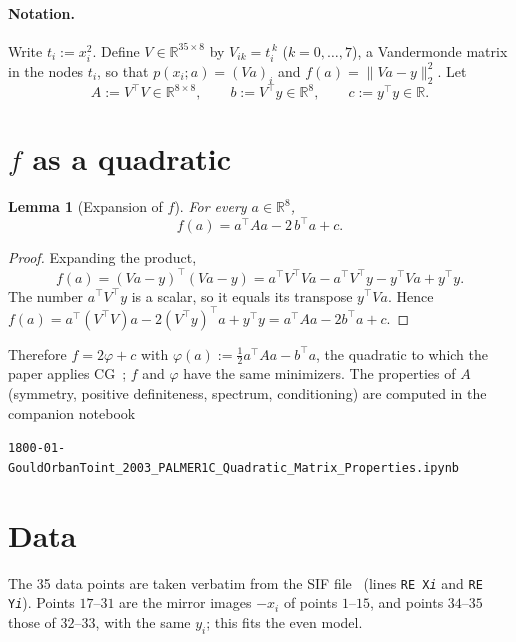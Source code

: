 \documentclass[11pt]{article}
\newtheorem{lemma}{Lemma}
\newcommand{\R}{\mathbb{R}}
\begin{document}
\paragraph{Notation.} Write $t_i:=x_i^2$. Define $V\in\R^{35\times 8}$ by
$V_{ik}=t_i^{\,k}$ ($k=0,\dots,7$), a Vandermonde matrix in the nodes $t_i$, so
that $p(x_i;a)=(Va)_i$ and $f(a)=\|Va-y\|_2^2$. Let
\[
  A:=V^{\top}V\in\R^{8\times8},\qquad b:=V^{\top}y\in\R^8,\qquad c:=y^{\top}y\in\R .
\]
\section{\texorpdfstring{$f$}{f} as a quadratic}

\begin{lemma}[Expansion of $f$]\label{lem:exp}
For every $a\in\R^8$,
\[
  f(a)=a^{\top}Aa-2\,b^{\top}a+c .
\]
\end{lemma}

\begin{proof}
Expanding the product,
\[
  f(a)=(Va-y)^{\top}(Va-y)=a^{\top}V^{\top}Va-a^{\top}V^{\top}y-y^{\top}Va+y^{\top}y .
\]
The number $a^{\top}V^{\top}y$ is a scalar, so it equals its transpose
$y^{\top}Va$. Hence $f(a)=a^{\top}(V^{\top}V)a-2(V^{\top}y)^{\top}a+y^{\top}y
=a^{\top}Aa-2b^{\top}a+c$.
\end{proof}

Therefore $f=2\varphi+c$ with $\varphi(a):=\tfrac12a^{\top}Aa-b^{\top}a$, the
quadratic to which the paper applies CG~\cite[p.~2152]{HZ13}; $f$ and $\varphi$
have the same minimizers. The properties of $A$ (symmetry, positive
definiteness, spectrum, conditioning) are computed in the companion notebook
\begin{center}\small\texttt{1800-01-GouldOrbanToint\_2003\_PALMER1C\_Quadratic\_Matrix\_Properties.ipynb}\end{center}

\section{Data}
The 35 data points are taken verbatim from the SIF file~\cite{SIF}
(lines \texttt{RE X\emph{i}} and \texttt{RE Y\emph{i}}).
Points $17$--$31$ are the mirror images $-x_i$ of points $1$--$15$, and points
$34$--$35$ those of $32$--$33$, with the same $y_i$; this fits the even model.
\end{document}
